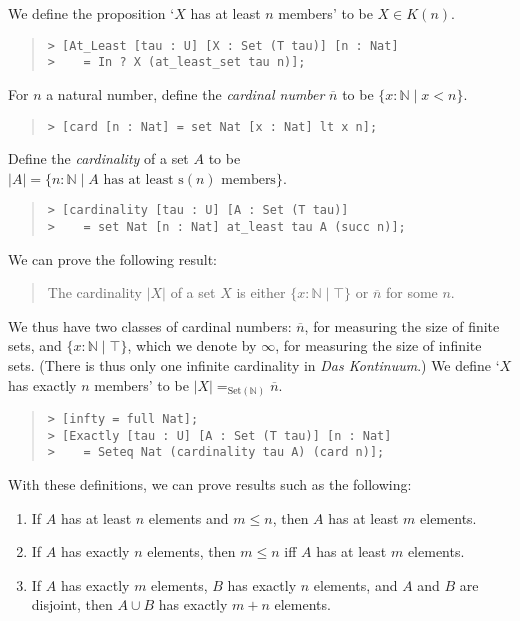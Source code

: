 \documentclass[acmtocl]{acmtrans2m}
\newcommand{\Set}[1]{\mathrm{Set} \left( {#1} \right)}
\newcommand{\s}{\mathrm{s}}
\begin{document}
We define the proposition `$X$ has at least $n$ members' to be $X \in K(n)$.
\begin{quote}
\begin{verbatim}
> [At_Least [tau : U] [X : Set (T tau)] [n : Nat]
>    = In ? X (at_least_set tau n)];
\end{verbatim}
\end{quote}

For $n$ a natural number, define the \emph{cardinal number} $\overline{n}$ to be $\{ x : \mathbb{N} \mid x < n \}$.
\begin{quote}
\begin{verbatim}
> [card [n : Nat] = set Nat [x : Nat] lt x n];
\end{verbatim}
\end{quote}
Define the \emph{cardinality} of a set $A$ to be $|A| = \{ n : \mathbb{N} \mid A \mbox{ has at least } \s(n) \mbox{ members} \}$.
\begin{quote}
\begin{verbatim}
> [cardinality [tau : U] [A : Set (T tau)]
>    = set Nat [n : Nat] at_least tau A (succ n)];
\end{verbatim}
\end{quote}
We can prove the following result:
\begin{quote}
The cardinality $|X|$ of a set $X$ is either $\{ x : \mathbb{N} \mid \top \}$ or $\overline{n}$ for some $n$.
\end{quote}
We thus have two classes of cardinal numbers: $\overline{n}$, for measuring the size of finite sets, and $\{ x : \mathbb{N} \mid \top \}$, which we denote by $\infty$, for measuring the size of infinite sets.  (There is thus only one infinite cardinality in \emph{Das Kontinuum}.)  We define `$X$ has exactly $n$ members' to be $|X| =_{\Set{\mathbb{N}}} \overline{n}$.
\begin{quote}
\begin{verbatim}
> [infty = full Nat];
> [Exactly [tau : U] [A : Set (T tau)] [n : Nat]
>    = Seteq Nat (cardinality tau A) (card n)];
\end{verbatim}
\end{quote}
\pagebreak
With these definitions, we can prove results such as the following:
\begin{enumerate}
\item
If $A$ has at least $n$ elements and $m \leq n$, then $A$ has at least $m$ elements.
\item
If $A$ has exactly $n$ elements, then $m \leq n$ iff $A$ has at least $m$ elements.
\item
If $A$ has exactly $m$ elements, $B$ has exactly $n$ elements, and $A$ and $B$ are disjoint, then $A \cup B$ has exactly $m + n$ elements.
\end{enumerate}
\end{document}
